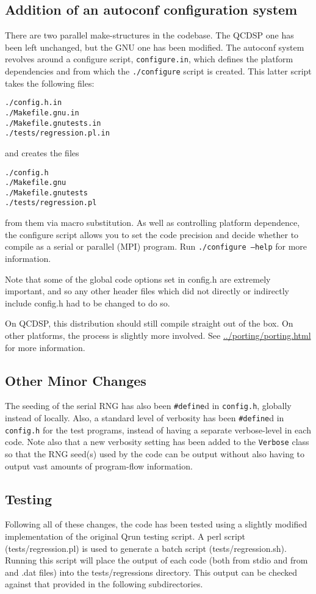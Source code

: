 \documentclass[12pt]{article}
\newcommand{\cde}[1]{{\tt #1}}            %
\begin{document}
\subsection{Addition of an autoconf configuration system}
There are two parallel make-structures in the codebase.  The QCDSP one has been
left unchanged, but the GNU one has been modified.  The autoconf system
revolves around a configure script, \cde{configure.in}, which defines the
platform dependencies and from which the \cde{./configure} script is created.
This latter script takes the following files:
\begin{verbatim}
./config.h.in
./Makefile.gnu.in
./Makefile.gnutests.in
./tests/regression.pl.in
\end{verbatim}
and creates the files
\begin{verbatim}
./config.h
./Makefile.gnu
./Makefile.gnutests
./tests/regression.pl
\end{verbatim}
from them via macro substitution.  As well as controlling platform dependence,
the configure script allows you to set the code precision and decide whether
to compile as a serial or parallel (MPI) program.  Run \cde{./configure
--help} for more information.

Note that some of the global code options set in config.h are extremely
important, and so any other header files which did not directly or indirectly
include config.h had to be changed to do so.

On QCDSP, this distribution should still compile straight out of the
box.  On other platforms, the process is slightly more involved.  See
\href{../porting/porting.html}{../porting/porting.html} for more information.

\subsection{Other Minor Changes}
The seeding of the serial RNG has also been \cde{\#define}d in \cde{config.h},
globally instead of locally.  Also, a standard level of verbosity has been
\cde{\#define}d in \cde{config.h} for the test programs, instead of having a
separate verbose-level in each code.  Note also that a new verbosity setting
has been added to the \cde{Verbose} class so that the RNG seed(s) used by the
code can be output without also having to output vast amounts of program-flow
information.

\subsection{Testing}
Following all of these changes, the code has been tested using a
slightly modified implementation of the original Qrun testing script.
A perl script (tests/regression.pl) is used to generate a batch script
(tests/regression.sh).  Running this script will place the output of
each code (both from stdio and from and .dat files) into the
tests/regressions directory.  This output can be checked against that
provided in the following subdirectories.
\end{document}
